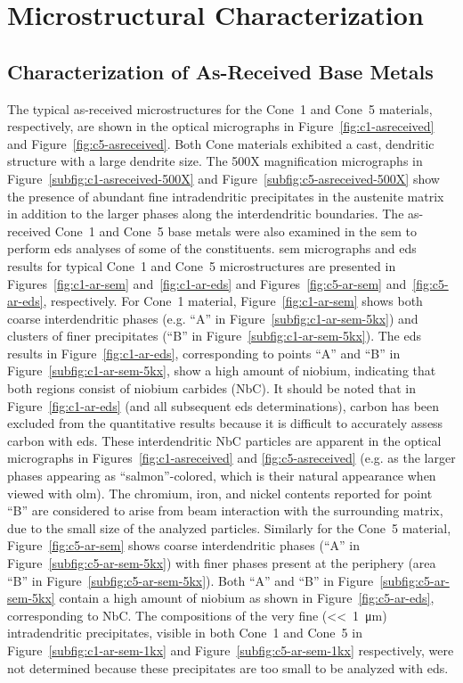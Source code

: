 {\section{Microstructural Characterization}
\subsection{Characterization of As-Received Base Metals}
The typical as-received microstructures for the Cone~1 and Cone~5 materials, respectively, are shown in the optical micrographs in Figure~\ref{fig:c1-asreceived} and Figure~\ref{fig:c5-asreceived}.  Both Cone materials exhibited a cast, dendritic structure with a large dendrite size.  The 500X magnification micrographs in Figure~\ref{subfig:c1-asreceived-500X} and Figure~\ref{subfig:c5-asreceived-500X} show the presence of abundant fine intradendritic precipitates in the austenite matrix in addition to the larger phases along the interdendritic boundaries. The as-received Cone~1 and Cone~5 base metals were also examined in the \gls{sem} to perform \gls{eds} analyses of some of the constituents. \Gls{sem} micrographs and \gls{eds} results for typical Cone~1 and Cone~5 microstructures are presented in Figures~\ref{fig:c1-ar-sem} and~\ref{fig:c1-ar-eds} and Figures~\ref{fig:c5-ar-sem} and~\ref{fig:c5-ar-eds}, respectively. For Cone~1 material, Figure~\ref{fig:c1-ar-sem} shows both coarse interdendritic phases (e.g. ``A'' in Figure~\ref{subfig:c1-ar-sem-5kx}) and clusters of finer precipitates (``B'' in Figure~\ref{subfig:c1-ar-sem-5kx}). The \gls{eds} results in Figure~\ref{fig:c1-ar-eds}, corresponding to points ``A'' and ``B'' in Figure~\ref{subfig:c1-ar-sem-5kx}, show a high amount of niobium, indicating that both regions consist of niobium carbides (NbC). It should be noted that in Figure~\ref{fig:c1-ar-eds} (and all subsequent \gls{eds} determinations), carbon has been excluded from the quantitative results because it is difficult to accurately assess carbon with \gls{eds}. These interdendritic NbC particles are apparent in the optical micrographs in Figures~\ref{fig:c1-asreceived} and \ref{fig:c5-asreceived} (e.g. as the larger phases appearing as ``salmon''-colored, which is their natural appearance when viewed with \gls{olm}). The chromium, iron, and nickel contents reported for point ``B'' are considered to arise from beam interaction with the surrounding matrix, due to the small size of the analyzed particles. Similarly for the Cone~5 material, Figure~\ref{fig:c5-ar-sem} shows coarse interdendritic phases (``A'' in Figure~\ref{subfig:c5-ar-sem-5kx}) with finer phases present at the periphery (area ``B'' in Figure~\ref{subfig:c5-ar-sem-5kx}). Both ``A'' and ``B'' in Figure~\ref{subfig:c5-ar-sem-5kx} contain a high amount of niobium as shown in Figure~\ref{fig:c5-ar-eds}, corresponding to NbC. The compositions of the very fine (<<~\SI{1}{\micro\meter}) intradendritic precipitates, visible in both Cone~1 and Cone~5 in Figure~\ref{subfig:c1-ar-sem-1kx} and Figure~\ref{subfig:c5-ar-sem-1kx} respectively, were not determined because these precipitates are too small to be analyzed with \gls{eds}. 

}
